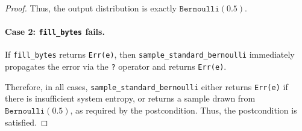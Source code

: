 \documentclass{article}
\begin{document}
\begin{proof}
Thus, the output distribution is exactly
$\texttt{Bernoulli}(0.5)$.

\paragraph{Case 2: \texttt{fill\_bytes} fails.}

If \texttt{fill\_bytes} returns \texttt{Err(e)}, then
\texttt{sample\_standard\_bernoulli} immediately propagates the error via the
\texttt{?} operator and returns \texttt{Err(e)}.

Therefore, in all cases,
\texttt{sample\_standard\_bernoulli} either returns \texttt{Err(e)} if there is
insufficient system entropy, or returns a sample drawn from
$\texttt{Bernoulli}(0.5)$, as required by the postcondition. Thus, the postcondition is satisfied.

\end{proof}
\end{document}
